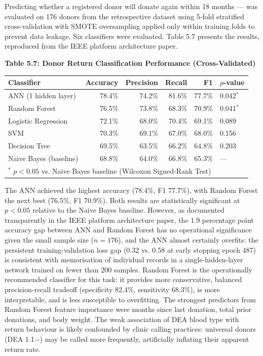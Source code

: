 \documentclass[12pt,a4paper]{article}
\begin{document}
\noindent Predicting whether a registered donor will donate again within 18 months — was evaluated on 176 donors from the retrospective dataset using 5-fold stratified cross-validation with SMOTE oversampling applied only within training folds to prevent data leakage. Six classifiers were evaluated. Table 5.7 presents the results, reproduced from the IEEE platform architecture paper.

\begin{center}
\textbf{Table 5.7: Donor Return Classification Performance (Cross-Validated)}
\vspace{0.4em}
\begin{tabular}{lrrrrl}
\toprule
\textbf{Classifier} & \textbf{Accuracy} & \textbf{Precision} & \textbf{Recall} & \textbf{F1} & \textbf{$p$-value} \\
\midrule
ANN (1 hidden layer) & 78.4\% & 74.2\% & 81.6\% & 77.7\% & 0.042$^*$ \\
Random Forest & 76.5\% & 73.8\% & 68.3\% & 70.9\% & 0.041$^*$ \\
Logistic Regression & 72.1\% & 68.0\% & 70.4\% & 69.1\% & 0.089 \\
SVM & 70.3\% & 69.1\% & 67.0\% & 68.0\% & 0.156 \\
Decision Tree & 69.5\% & 63.5\% & 66.2\% & 64.8\% & 0.203 \\
Naive Bayes (baseline) & 68.8\% & 64.0\% & 66.8\% & 65.3\% & — \\
\bottomrule
\multicolumn{6}{l}{$^*$ $p < 0.05$ vs. Naive Bayes baseline (Wilcoxon Signed-Rank Test)}
\end{tabular}
\end{center}

\noindent The ANN achieved the highest accuracy (78.4\%, F1 77.7\%), with Random Forest the next best (76.5\%, F1 70.9\%). Both results are statistically significant at $p < 0.05$ relative to the Naive Bayes baseline. However, as documented transparently in the IEEE platform architecture paper, the 1.9 percentage point accuracy gap between ANN and Random Forest has no operational significance given the small sample size ($n = 176$), and the ANN almost certainly overfits: the persistent training-validation loss gap (0.32 vs. 0.58 at early stopping epoch 487) is consistent with memorisation of individual records in a single-hidden-layer network trained on fewer than 200 samples. Random Forest is the operationally recommended classifier for this task: it provides more conservative, balanced precision-recall tradeoff (specificity 82.4\%, sensitivity 68.3\%), is more interpretable, and is less susceptible to overfitting. The strongest predictors from Random Forest feature importance were months since last donation, total prior donations, and body weight. The weak association of DEA blood type with return behaviour is likely confounded by clinic calling practices: universal donors (DEA 1.1$-$) may be called more frequently, artificially inflating their apparent return rate.
\end{document}
